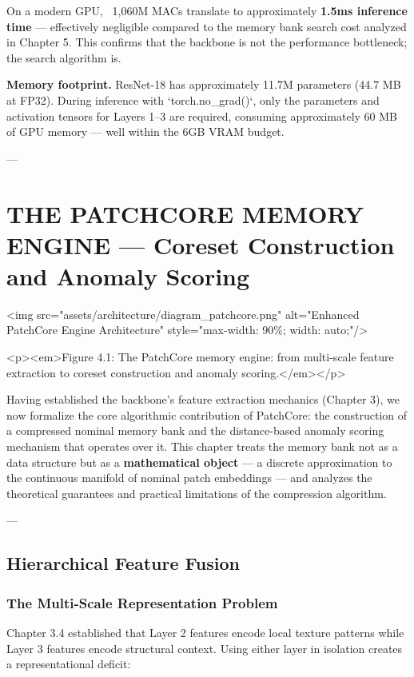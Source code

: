 \documentclass[12pt,a4paper,oneside]{report}
\begin{document}
On a modern GPU, ~1,060M MACs translate to approximately \textbf{1.5ms inference time} --- effectively negligible compared to the memory bank search cost analyzed in Chapter 5. This confirms that the backbone is not the performance bottleneck; the search algorithm is.

\textbf{Memory footprint.} ResNet-18 has approximately 11.7M parameters (44.7 MB at FP32). During inference with `torch.no_grad()`, only the parameters and activation tensors for Layers 1--3 are required, consuming approximately 60 MB of GPU memory --- well within the 6GB VRAM budget.

---

\chapter{THE PATCHCORE MEMORY ENGINE --- Coreset Construction and Anomaly Scoring}




  <img src="assets/architecture/diagram_patchcore.png" alt="Enhanced PatchCore Engine Architecture" style="max-width: 90\%; width: auto;"/>
  
  <p><em>Figure 4.1: The PatchCore memory engine: from multi-scale feature extraction to coreset construction and anomaly scoring.</em></p>


Having established the backbone's feature extraction mechanics (Chapter 3), we now formalize the core algorithmic contribution of PatchCore: the construction of a compressed nominal memory bank and the distance-based anomaly scoring mechanism that operates over it. This chapter treats the memory bank not as a data structure but as a \textbf{mathematical object} --- a discrete approximation to the continuous manifold of nominal patch embeddings --- and analyzes the theoretical guarantees and practical limitations of the compression algorithm.

---

\section{Hierarchical Feature Fusion}

\subsection{The Multi-Scale Representation Problem}

Chapter 3.4 established that Layer 2 features encode local texture patterns while Layer 3 features encode structural context. Using either layer in isolation creates a representational deficit:
\end{document}
